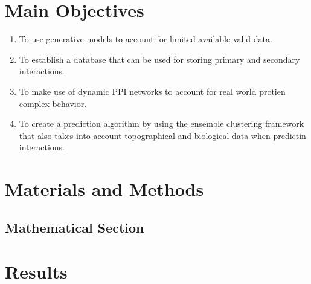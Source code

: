 \documentclass[a0, landscape]{a0poster}
\begin{document}
\begin{multicols}{4}
\color{DarkSlateGray} %

\section*{Main Objectives}

\begin{enumerate}
\item To use generative models to account for limited available valid data.
\item To establish a database that can be used for storing primary and secondary interactions.
\item To make use of dynamic PPI networks to account for real world protien complex behavior.
\item To create a prediction algorithm by using the ensemble clustering framework that also takes into account topographical and biological data when predictin interactions.
\end{enumerate}


\section*{Materials and Methods}


\subsection*{Mathematical Section}


\section*{Results}

\color{SaddleBrown} %


\end{multicols}
\end{document}
